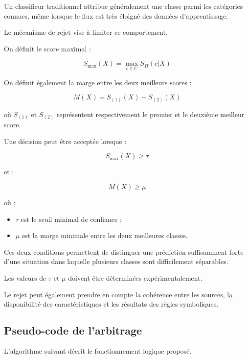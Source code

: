 Un classifieur traditionnel attribue généralement une classe parmi les catégories connues, même lorsque le flux est très éloigné des données d'apprentissage.

Le mécanisme de rejet vise à limiter ce comportement.

On définit le score maximal :

\[
S_{\max}(X)=\max_{c\in C}S_H(c|X)
\]

On définit également la marge entre les deux meilleurs scores :

\[
M(X)=S_{(1)}(X)-S_{(2)}(X)
\]

où $S_{(1)}$ et $S_{(2)}$ représentent respectivement le premier et le deuxième meilleur score.

Une décision peut être acceptée lorsque :

\[
S_{\max}(X)\geq\tau
\]

et :

\[
M(X)\geq\mu
\]

où :

\begin{itemize}
    \item $\tau$ est le seuil minimal de confiance ;
    \item $\mu$ est la marge minimale entre les deux meilleures classes.
\end{itemize}

Ces deux conditions permettent de distinguer une prédiction suffisamment forte d'une situation dans laquelle plusieurs classes sont difficilement séparables.

Les valeurs de $\tau$ et $\mu$ doivent être déterminées expérimentalement.

Le rejet peut également prendre en compte la cohérence entre les sources, la disponibilité des caractéristiques et les résultats des règles symboliques.

\subsection{Pseudo-code de l'arbitrage}

L'algorithme suivant décrit le fonctionnement logique proposé.

